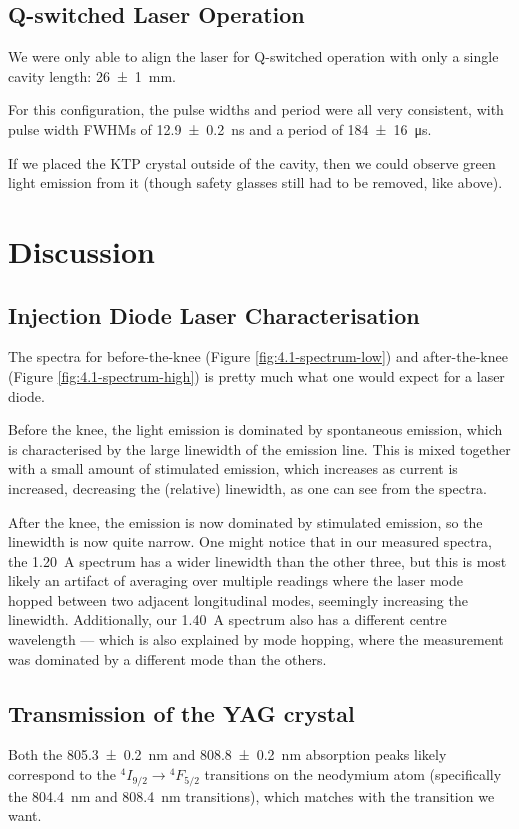 \documentclass[a4paper]{scrartcl}
\begin{document}
\subsection{Q-switched Laser Operation}
We were only able to align the laser for Q-switched operation with only a single cavity length: \SI{26 \pm 1}{\milli\metre}.

For this configuration, the pulse widths and period were all very consistent, with pulse width FWHMs of \SI{12.9 \pm 0.2}{\nano\second} and a period of \SI{184 \pm 16}{\micro\second}.

If we placed the KTP crystal outside of the cavity, then we could observe green light emission from it (though safety glasses still had to be removed, like above).

\section{Discussion}
\subsection{Injection Diode Laser Characterisation}
The spectra for before-the-knee (Figure \ref{fig:4.1-spectrum-low}) and after-the-knee (Figure \ref{fig:4.1-spectrum-high}) is pretty much what one would expect for a laser diode.

Before the knee, the light emission is dominated by spontaneous emission, which is characterised by the large linewidth of the emission line. This is mixed together with a small amount of stimulated emission, which increases as current is increased, decreasing the (relative) linewidth, as one can see from the spectra.

After the knee, the emission is now dominated by stimulated emission, so the linewidth is now quite narrow. One might notice that in our measured spectra, the \SI{1.20}{\ampere} spectrum has a wider linewidth than the other three, but this is most likely an artifact of averaging over multiple readings where the laser mode hopped between two adjacent longitudinal modes, seemingly increasing the linewidth. Additionally, our \SI{1.40}{\ampere} spectrum also has a different centre wavelength --- which is also explained by mode hopping, where the measurement was dominated by a different mode than the others.

\subsection{Transmission of the YAG crystal}
Both the \SI{805.3 \pm 0.2}{\nano\metre} and \SI{808.8 \pm 0.2}{\nano\metre} absorption peaks likely correspond to the \({}^4 I_{9/2} \to {}^4 F_{5/2}\) transitions on the neodymium atom (specifically the \SI{804.4}{\nano\metre} and \SI{808.4}{\nano\metre} transitions), which matches with the transition we want.
\end{document}
